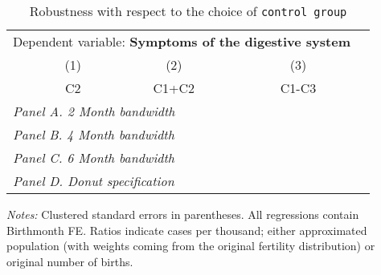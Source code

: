  \begin{table}[H] \begin{threeparttable} \centering \caption{Robustness with respect to the choice of \texttt{control group}} {\def\sym#1{\ifmmode^{#1}\else\(^{#1}\)\fi} \begin{tabular}{l*{4}{c}} \toprule \multicolumn{4}{c}{Dependent variable: \textbf{Symptoms of the digestive system}} \\ \cmidrule(lr){2-4}
            &\multicolumn{1}{c}{(1)}&\multicolumn{1}{c}{(2)}&\multicolumn{1}{c}{(3)}\\
            &\multicolumn{1}{c}{C2}&\multicolumn{1}{c}{C1+C2}&\multicolumn{1}{c}{C1-C3}\\
\midrule
 \multicolumn{4}{l}{\emph{Panel A. 2 Month bandwidth}} \\    \midrule\multicolumn{4}{l}{\emph{Panel B. 4 Month bandwidth}} \\    \midrule\multicolumn{4}{l}{\emph{Panel C. 6 Month bandwidth}} \\    \midrule\multicolumn{4}{l}{\emph{Panel D. Donut specification}} \\    
\bottomrule \end{tabular} } \begin{tablenotes} \item \scriptsize \emph{Notes:} Clustered standard errors in parentheses. All regressions contain Birthmonth FE. Ratios indicate cases per thousand; either approximated population (with weights coming from the original fertility distribution) or original number of births. \end{tablenotes} \end{threeparttable} \end{table} 
